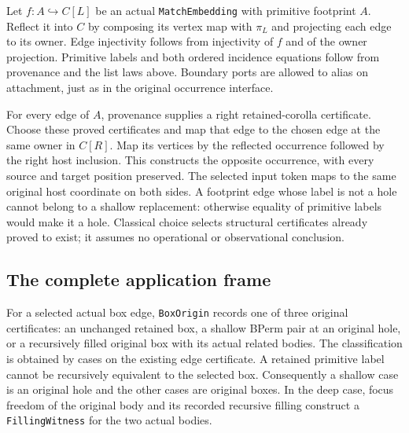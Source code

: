 
Let $f:A\hookrightarrow C[L]$ be an actual \texttt{MatchEmbedding} with
primitive footprint $A$. Reflect it into $C$ by composing its vertex map
with $\pi_L$ and projecting each edge to its owner. Edge injectivity follows
from injectivity of $f$ and of the owner projection. Primitive labels and
both ordered incidence equations follow from provenance and the list laws
above. Boundary ports are allowed to alias on attachment, just as in the
original occurrence interface.


For every edge of $A$, provenance supplies a right retained-corolla
certificate. Choose these proved certificates and map that edge to the
chosen edge at the same owner in $C[R]$. Map its vertices by the reflected
occurrence followed by the right host inclusion. This constructs the
opposite occurrence, with every source and target position preserved.
The selected input token maps to the same original host coordinate on both
sides. A footprint edge whose label is not a hole cannot belong to a shallow
replacement: otherwise equality of primitive labels would make it a hole.
Classical choice selects structural certificates already proved to exist;
it assumes no operational or observational conclusion.


\subsection{The complete application frame}
For a selected actual box edge, \texttt{BoxOrigin} records one of three
original certificates: an unchanged retained box, a shallow BPerm pair at an
original hole, or a recursively filled original box with its actual related
bodies. The classification is obtained by cases on the existing edge
certificate. A retained primitive label cannot be recursively equivalent to
the selected box. Consequently a shallow case is an original hole and the
other cases are original boxes. In the deep case, focus freedom of the
original body and its recorded recursive filling construct a
\texttt{FillingWitness} for the two actual bodies.

